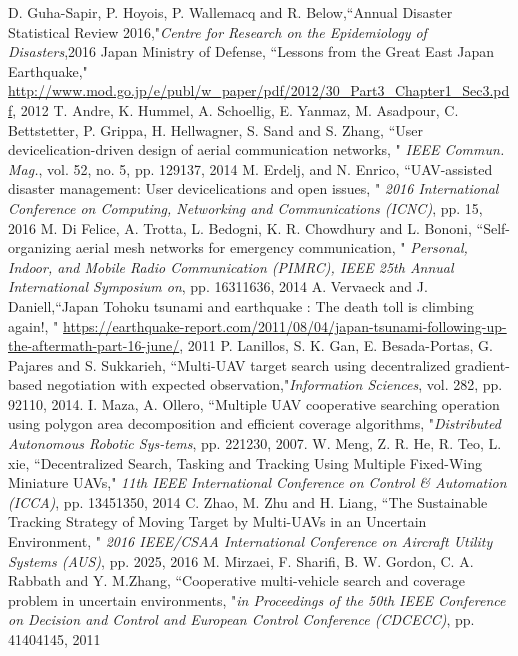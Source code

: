 \documentclass{ieeeaccess}
\begin{document}
\ifCLASSOPTIONcaptionsoff
  \newpage
\fi

\begin{thebibliography}{1}
D. Guha-Sapir, P. Hoyois, P. Wallemacq and R. Below,``Annual Disaster Statistical Review 2016,"\emph{Centre for Research on
the Epidemiology of Disasters},2016 
 Japan Ministry of Defense, ``Lessons from the Great East Japan Earthquake," \url{http://www.mod.go.jp/e/publ/w_paper/pdf/2012/30_Part3_Chapter1_Sec3.pdf}, 2012
 T. Andre, K. Hummel, A. Schoellig, E. Yanmaz, M. Asadpour, C. Bettstetter, P. Grippa, H. Hellwagner, S. Sand and S. Zhang, ``User devicelication-driven design of aerial communication networks, " \emph{IEEE Commun. Mag.}, vol. 52, no. 5, pp. 129137, 2014
 M. Erdelj, and N. Enrico, ``UAV-assisted disaster management: User devicelications and open issues, " \emph{2016 International Conference on Computing, Networking and Communications (ICNC)}, pp. 15, 2016
 M. Di Felice, A. Trotta, L. Bedogni, K. R. Chowdhury and L. Bononi, ``Self-organizing aerial mesh networks for emergency communication, " \emph{Personal, Indoor, and Mobile Radio Communication (PIMRC), IEEE 25th Annual International Symposium on}, pp. 16311636, 2014
A. Vervaeck and J. Daniell,``Japan Tohoku tsunami and earthquake : The death toll is climbing again!, " \url{https://earthquake-report.com/2011/08/04/japan-tsunami-following-up-the-aftermath-part-16-june/}, 2011
 P. Lanillos, S. K. Gan, E. Besada-Portas, G. Pajares and S. Sukkarieh, ``Multi-UAV target search using decentralized gradient-based negotiation with expected observation,"\emph{Information Sciences}, vol. 282, pp. 92110, 2014.
 I. Maza, A. Ollero, ``Multiple UAV cooperative searching operation
using polygon area decomposition and efficient coverage algorithms, "\emph{Distributed Autonomous Robotic Sys-tems}, pp. 221230, 2007.
 W. Meng, Z. R. He, R. Teo, L. xie, ``Decentralized Search, Tasking and Tracking Using Multiple Fixed-Wing Miniature UAVs," \emph{11th IEEE International Conference on Control \& Automation (ICCA)}, pp. 13451350, 2014 
 C. Zhao, M. Zhu and H. Liang, ``The Sustainable Tracking Strategy of Moving Target by Multi-UAVs in an Uncertain Environment, " \emph{2016 IEEE/CSAA International Conference on Aircraft Utility Systems (AUS)}, pp. 2025, 2016
 M. Mirzaei, F. Sharifi, B. W. Gordon, C. A. Rabbath and  Y. M.Zhang, ``Cooperative multi-vehicle search and coverage problem in uncertain environments, "\emph{in Proceedings of the 50th IEEE Conference on Decision and Control and European Control Conference (CDCECC)}, pp. 41404145, 2011

\end{thebibliography}
\end{document}

